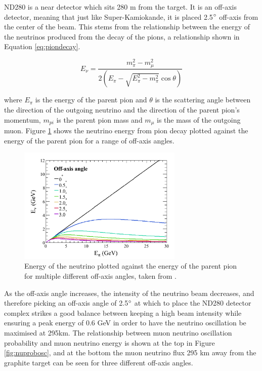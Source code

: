ND280 is a near detector which sits 280 m from the target. It is an off-axis detector, meaning that just like Super-Kamiokande, it is placed 2.5$\degree$ off-axis from the center of the beam. This stems from the relationship between the energy of the neutrinos produced from the decay of the pions, a relationship shown in Equation \ref{eq:piondecay}. 

\begin{equation}
    E_{\nu}=\frac{m_{\pi}^{2}-m_{\mu}^{2}}{2\left(E_{\pi}-\sqrt{E_{\pi}^{2}-m_{\pi}^{2}} \cos \theta\right)}
\label{eq:piondecay}
\end{equation}

where $E_{\pi}$ is the energy of the parent pion and $\theta$ is the scattering angle between the direction of the outgoing neutrino and the direction of the parent pion's momentum, $m_{pi}$ is the parent pion mass and $m_{\mu}$ is the mass of the outgoing muon. Figure \ref{fig:energyangle} shows the neutrino energy from pion decay plotted against the energy of the parent pion for a range of off-axis angles. 

\begin{figure}
\centering
\includegraphics[width=0.7\textwidth]{Figures/energy_angle.PNG}
\caption{Energy of the neutrino plotted against the energy of the parent pion for multiple different off-axis angles, taken from \cite{t2k_collaboration_t2k_2013}.}
\label{fig:energyangle}
\end{figure}

As the off-axis angle increases, the intensity of the neutrino beam decreases, and therefore picking an off-axis angle of 2.5$\degree$ at which to place the ND280 detector complex strikes a good balance between keeping a high beam intensity while ensuring a peak energy of 0.6 GeV in order to have the neutrino oscillation be maximised at 295km. The relationship between muon neutrino oscillation probability and muon neutrino energy is shown at the top in Figure \ref{fig:nuprobosc}, and at the bottom the muon neutrino flux 295 km away from the graphite target can be seen for three different off-axis angles.

